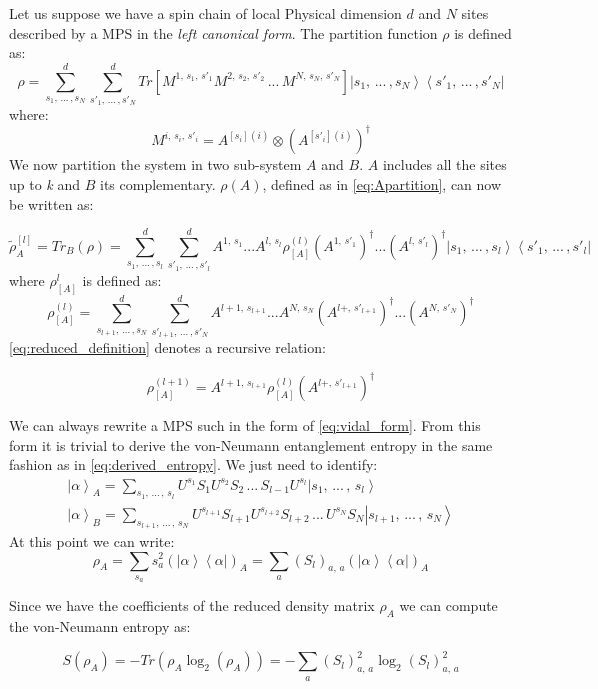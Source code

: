 \documentclass[12pt, a4paper, twoside, titlepage]{article}
\newcommand{\ket}[1]{\ensuremath{\left|#1\right\rangle}}
\newcommand{\bra}[1]{\ensuremath{\left\langle#1\right|}}
\begin{document}
Let us suppose we have a spin chain of local Physical dimension $d$ and $N$ sites described by a MPS in the  \textit{left canonical form}. The partition function $\rho$ is defined as:
\begin{equation}
\rho = \sum^d_{s_1, \, ... \, , s_N }\sum^d_{s'_1, \, ... \, , s'_N }Tr\left[ M^{1,\, s_1, \, s'_1} M^{2, \, s_2,\, s'_2} \, ... \, M^{N, \, s_N,\, s'_N} \right]\ket{s_1, \, ... \, , s_N} \bra{s'_1, \, ... \, , s'_N}
\end{equation}
where:
\begin{equation}
M^{i,\, s_i, \, s'_i} = A^{[s_i](i)} \otimes \left(A^{[s'_i](i)} \right)^\dag
\end{equation}
We now partition the system in two sub-system $A$ and $B$. $A$ includes all the sites up to \textit{k} and $B$ its complementary.
$\rho(A)$, defined as in \cref{eq:Apartition}, can now be written as:

\begin{equation}
\tilde{\rho}_A^{[l]}=Tr_B(\rho)= \sum^d_{s_1, \, ... \, , s_l }\sum^d_{s'_1, \, ... \, , s'_l }  A^{1, \, s_1} ... A^{l, \, s_l} \rho^{(l)}_{[A]}  \left( A^{1, \, s'_1} \right)^\dag ... \left(A^{l, \, s'_l}\right)^\dag \ket{s_1, \, ... \, , s_l} \bra{s'_1, \, ... \, , s'_l}
\end{equation}
where $\rho^l_{[A]}$ is defined as:
\begin{equation}\label{eq:reduced_definition}
\rho^{(l)}_{[A]}= \sum^d_{s_{l+1}, \, ... \, , s_N }\sum^d_{s'_{l+1}, \, ... \, , s'_N }  A^{l+1, \, s_{l+1}} ... A^{N, \, s_N}  \left( A^{l+, \, s'_{l+1}} \right)^\dag ... \left(A^{N, \, s'_N}\right)^\dag
\end{equation}
\cref{eq:reduced_definition} denotes a recursive relation:

\begin{equation}
\rho^{(l+1)}_{[A]} = A^{l+1, \, s_{l+1}} \rho^{(l)}_{[A]} \left( A^{l+, \, s'_{l+1}} \right)^\dag
\end{equation}


We can always rewrite a MPS such in the form of \cref{eq:vidal_form}. From this form it is trivial to derive the von-Neumann entanglement entropy in the same fashion as in \cref{eq:derived_entropy}. We just need to identify:
\begin{align}
\ket {\alpha}_A = \sum_{s_1, \, ... \, , \, s_l} U^{s_1} S_{1}U^{s_2} S_{2} \, ... \,S_{l-1} U^{s_l}  \ket{s_1, \, ... \, , \, s_l}\\
\ket {\alpha}_B = \sum_{s_{l+1}, \, ... \, , \, s_N} U^{s_{l+1}} S_{{l+1}}U^{s_{l+2}} S_{l+2} \, ... \, U^{s_N} S_{N} \ket{s_{l+1}, \, ... \, , \, s_N}
\end{align}
At this point we can write:
\begin{equation}\label{eq:canonical_rho_a}
\rho_A =  \sum_{s_a} s^2_a  \left( \ket{\alpha} \bra{\alpha}\right)_A= \sum_a \left( S_{l} \right)_{a, \,a} \left( \ket{\alpha} \bra{\alpha}\right)_A
\end{equation}

Since we have the coefficients of the reduced density matrix $\rho_A$ we can compute the von-Neumann entropy as:


\begin{equation}\label{eq:derived_entropy}
S(\rho_A)=-Tr(\rho_A\log_2(\rho_A))= -\sum_a \left( S_{l} \right)_{a, \,a}^2 \log_2 \left( S_{l} \right)_{a, \,a}^2
\end{equation}
\end{document}
